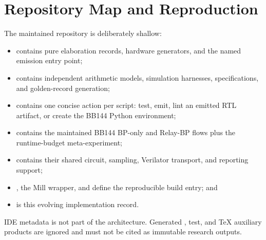 \documentclass[10pt,conference]{IEEEtran}
\begin{document}
\section{Repository Map and Reproduction}
The maintained repository is deliberately shallow:
\begin{itemize}
  \item {} contains pure elaboration records,
        hardware generators, and the named emission entry point;
  \item {} contains independent arithmetic models,
        simulation harnesses, specifications, and golden-record generation;
  \item {} contains one concise action per script: test, emit,
        lint an emitted RTL artifact, or create the BB144 Python environment;
  \item {} contains the maintained BB144 BP-only and Relay-BP
        flows plus the runtime-budget meta-experiment;
  \item {} contains their shared circuit, sampling,
        Verilator transport, and reporting support;
  \item {}, the Mill wrapper, and  define the
        reproducible build entry; and
  \item {} is this evolving implementation record.
\end{itemize}
IDE metadata is not part of the architecture.  Generated , test,
and TeX auxiliary products are ignored and must not be cited as immutable
research outputs.
\end{document}
